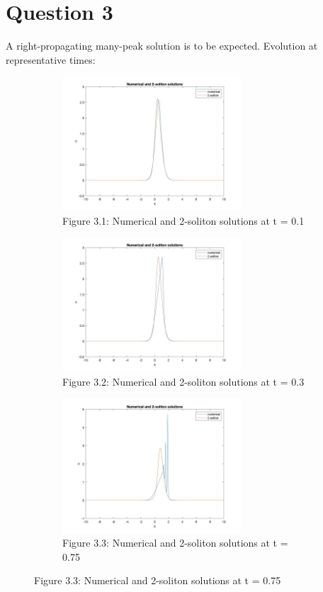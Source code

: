 \documentclass[a4paper,11pt]{article}
\begin{document}
\section{Question 3}
A right-propagating many-peak solution is to be expected. 
Evolution at representative times: 
\begin{figure}[H]
\begin{subfigure}{0.5\textwidth}
\includegraphics[width = \linewidth, height = 5cm]{Q3(1).jpg}
\caption{Figure 3.1: Numerical and 2-soliton solutions at t = 0.1}
\label{Q2(1)}
\end{subfigure}
\begin{subfigure}{0.5\textwidth}
\includegraphics[width = \linewidth, height = 5cm]{Q3(2).jpg}
\caption{Figure 3.2: Numerical and 2-soliton solutions at t = 0.3}
\label{Q2(2)}
\end{subfigure}
\begin{subfigure}{0.5\textwidth}
\includegraphics[width = \linewidth, height = 5cm]{Q3(3).jpg}
\caption{Figure 3.3: Numerical and 2-soliton solutions at t = 0.75}
\label{Q2(3)}

\end{subfigure}
\end{figure}
\end{document}
